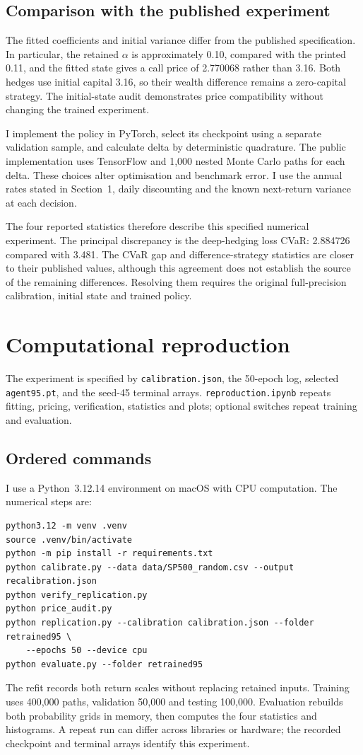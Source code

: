 \documentclass[11pt,a4paper]{article}
\theoremstyle{remark}
\begin{document}
\subsection{Comparison with the published experiment}
The fitted coefficients and initial variance differ from the published specification. In particular, the retained $\alpha$ is approximately 0.10, compared with the printed 0.11, and the fitted state gives a call price of 2.770068 rather than 3.16. Both hedges use initial capital 3.16, so their wealth difference remains a zero-capital strategy. The initial-state audit demonstrates price compatibility without changing the trained experiment.

I implement the policy in PyTorch, select its checkpoint using a separate validation sample, and calculate delta by deterministic quadrature. The public implementation uses TensorFlow and 1,000 nested Monte Carlo paths for each delta. These choices alter optimisation and benchmark error. I use the annual rates stated in Section~1, daily discounting and the known next-return variance at each decision.

The four reported statistics therefore describe this specified numerical experiment. The principal discrepancy is the deep-hedging loss CVaR: 2.884726 compared with 3.481. The CVaR gap and difference-strategy statistics are closer to their published values, although this agreement does not establish the source of the remaining differences. Resolving them requires the original full-precision calibration, initial state and trained policy.

\appendix
\section{Computational reproduction}
The experiment is specified by \texttt{calibration.json}, the 50-epoch log, selected \texttt{agent95.pt}, and the seed-45 terminal arrays. \texttt{reproduction.ipynb} repeats fitting, pricing, verification, statistics and plots; optional switches repeat training and evaluation.

\subsection{Ordered commands}
I use a Python~3.12.14 environment on macOS with CPU computation. The numerical steps are:
\begin{verbatim}
python3.12 -m venv .venv
source .venv/bin/activate
python -m pip install -r requirements.txt
python calibrate.py --data data/SP500_random.csv --output recalibration.json
python verify_replication.py
python price_audit.py
python replication.py --calibration calibration.json --folder retrained95 \
    --epochs 50 --device cpu
python evaluate.py --folder retrained95
\end{verbatim}
The refit records both return scales without replacing retained inputs. Training uses 400,000 paths, validation 50,000 and testing 100,000. Evaluation rebuilds both probability grids in memory, then computes the four statistics and histograms. A repeat run can differ across libraries or hardware; the recorded checkpoint and terminal arrays identify this experiment.
\end{document}
